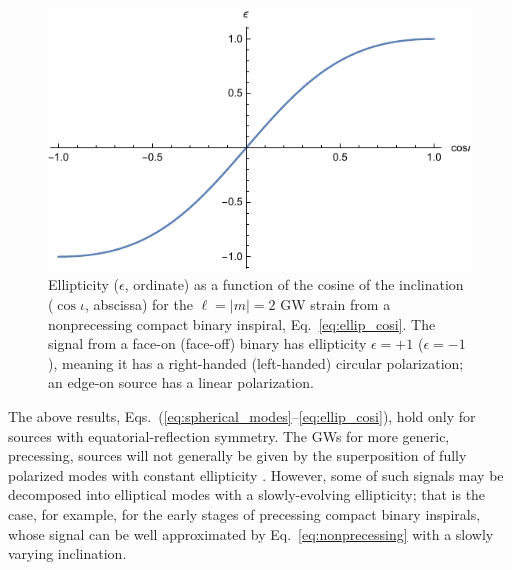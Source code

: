 \documentclass[aps,prd,twocolumn,superscriptaddress,preprintnumbers,floatfix,nofootinbib]{revtex4-2}
\newcommand*{\eq}[1]{Eq.~\eqref{eq:#1}}
\begin{document}
\begin{figure}
\includegraphics[width=\columnwidth]{ellip_cosi}
\caption{Ellipticity ($\epsilon$, ordinate) as a function of the cosine of the inclination ($\cos\iota$, abscissa) for the $\ell = |m| = 2$ GW strain from a nonprecessing compact binary inspiral, Eq.~\eqref{eq:ellip_cosi}. The signal from a face-on (face-off) binary has ellipticity $\epsilon = +1$ ($\epsilon=-1$), meaning it has a right-handed (left-handed) circular polarization; an edge-on source has a linear polarization.}
\label{fig:ellip_cosi}
\end{figure}

The above results, Eqs.~(\ref{eq:spherical_modes}--\ref{eq:ellip_cosi}), hold only for sources with equatorial-reflection symmetry.
The GWs for more generic, precessing, sources will not generally be given by the superposition of fully polarized modes with constant ellipticity \cite{Buonanno:2002fy,Schmidt:2010it,Schmidt:2012rh,Ochsner:2012dj,Boyle:2011gg,Blanchet:2013haa,Lousto:2018dgd}.
However, some of such signals may be decomposed into elliptical modes with a slowly-evolving ellipticity; that is the case, for example, for the early stages of precessing compact binary inspirals, whose signal can be well approximated by \eq{nonprecessing} with a slowly varying inclination.
\end{document}
